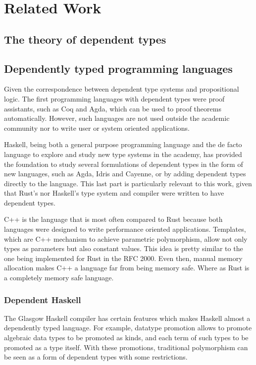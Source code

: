 \chapter{Related Work} \label{chapter:related_work}

\section{The theory of dependent types}

\section{Dependently typed programming languages}

Given the correspondence between dependent type systems and propositional logic.
The first programming languages with dependent types were proof assistants, such
as Coq and Agda, \cite{agda} which can be used to proof theorems automatically.
However, such languages are not used outside the academic community nor to write
user or system oriented applications.

Haskell, being both a general purpose programming language and the de facto
language to explore and study new type systems in the academy, has provided the
foundation to study several formulations of dependent types in the form of new
languages, such as Agda, Idris \cite{idris} and Cayenne, \cite{cayenne} or by
adding dependent types directly to the language. This last part is particularly
relevant to this work, given that Rust's nor Haskell's type system and compiler
were written to have dependent types.

C++ is the language that is most often compared to Rust because both languages
were designed to write performance oriented applications. Templates, which are
C++ mechanism to achieve parametric polymorphism, allow not only types as
parameters but also constant values. \cite{templates} This idea is pretty
similar to the one being implemented for Rust in the RFC 2000. Even then, manual
memory allocation makes C++ a language far from being memory safe.  Where as
Rust is a completely memory safe language.    

\subsection{Dependent Haskell} 

The Glasgow Haskell compiler has certain features which makes Haskell almost a
dependently typed language. For example, datatype promotion allows to promote
algebraic data types to be promoted as kinds, and each term of such types to be 
promoted as a type itself. With these promotions, traditional polymorphism can
be seen as a form of dependent types with some restrictions.

